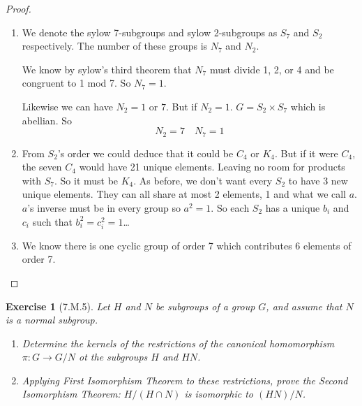 \documentclass[12pt]{article}
\newtheorem*{exer}{Exercise}
\begin{document}
\begin{proof}

    \begin{enumerate}
        \item We denote the sylow 7-subgroups and sylow 2-subgroups as
            $S_7$ and $S_2$ respectively. The number of these groups is
            $N_7$ and $N_2$. 

            We know by sylow's third theorem that $N_7$ must divide 1,
            2, or 4 and be congruent to 1 mod 7. So $N_7 = 1$. 

            Likewise we can have $N_2 = 1$ or $7$. But if $N_2 = 1$.
            $G = S_2 \times S_7$ which is abellian. So
            \[
                N_2 = 7 \quad N_7 = 1
            \]

        \item From $S_2$'s order we could deduce that it could be $C_4$
            or $K_4$. But if it were $C_4$, the seven $C_4$ would have
            21 unique elements. Leaving no room for products with $S_7$.
            So it must be $K_4$. As before, we don't want every $S_2$ to
            have 3 new unique elements. They can all share at most 2
            elements, 1 and what we call $a$. $a$'s inverse must be in
            every group so $a^2 = 1$. So each $S_2$ has a unique $b_i$
            and $c_i$ such that $b^{2}_{i} = c^{2}_{i} = 1$\dots

        \item We know there is one cyclic group of order 7 which
            contributes 6 elements of order 7.

    \end{enumerate}

\end{proof}


\begin{exer}[7.M.5]

    Let $H$ and $N$ be subgroups of a group $G$, and assume that $N$ is
    a normal subgroup.

    \begin{enumerate}
        \item Determine the kernels of the restrictions of the canonical
            homomorphism $\pi : G \rightarrow G/N$ ot the subgroups $H$
            and $HN$. 

        \item Applying First Isomorphism Theorem to these restrictions,
            prove the \textit{Second Isomorphism Theorem}: $H/(H \cap
            N)$ is isomorphic to $(HN)/N$. 
    \end{enumerate}

\end{exer}
\end{document}
